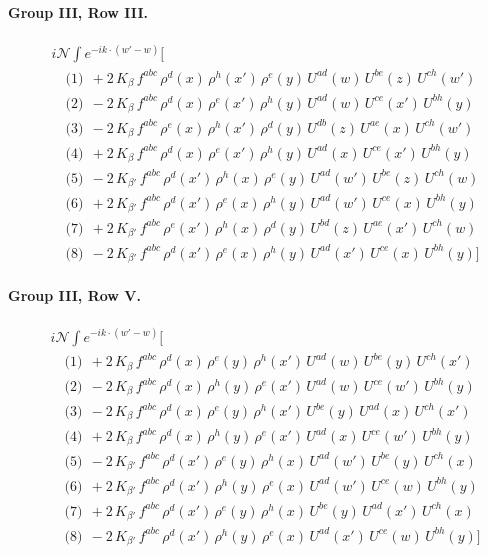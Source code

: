 \documentclass[10pt]{article}
\numberwithin{equation}{section}
\newcommand{\NN}{\mathcal N}
\begin{document}
\paragraph{Group III, Row III.}
\begin{align*}
&i\NN\int e^{-ik\cdot(w'-w)}\Big[\\
&\quad\text{(1)}\ \ +2\,K_{\beta}\,f^{abc}\,\rho^{d}(x)\,\rho^{h}(x')\,\rho^{e}(y)\,U^{ad}(w)\,U^{be}(z)\,U^{ch}(w')\\
&\quad\text{(2)}\ \ -2\,K_{\beta}\,f^{abc}\,\rho^{d}(x)\,\rho^{e}(x')\,\rho^{h}(y)\,U^{ad}(w)\,U^{ce}(x')\,U^{bh}(y)\\
&\quad\text{(3)}\ \ -2\,K_{\beta}\,f^{abc}\,\rho^{e}(x)\,\rho^{h}(x')\,\rho^{d}(y)\,U^{db}(z)\,U^{ae}(x)\,U^{ch}(w')\\
&\quad\text{(4)}\ \ +2\,K_{\beta}\,f^{abc}\,\rho^{d}(x)\,\rho^{e}(x')\,\rho^{h}(y)\,U^{ad}(x)\,U^{ce}(x')\,U^{bh}(y)\\
&\quad\text{(5)}\ \ -2\,K_{\beta'}\,f^{abc}\,\rho^{d}(x')\,\rho^{h}(x)\,\rho^{e}(y)\,U^{ad}(w')\,U^{be}(z)\,U^{ch}(w)\\
&\quad\text{(6)}\ \ +2\,K_{\beta'}\,f^{abc}\,\rho^{d}(x')\,\rho^{e}(x)\,\rho^{h}(y)\,U^{ad}(w')\,U^{ce}(x)\,U^{bh}(y)\\
&\quad\text{(7)}\ \ +2\,K_{\beta'}\,f^{abc}\,\rho^{e}(x')\,\rho^{h}(x)\,\rho^{d}(y)\,U^{bd}(z)\,U^{ae}(x')\,U^{ch}(w)\\
&\quad\text{(8)}\ \ -2\,K_{\beta'}\,f^{abc}\,\rho^{d}(x')\,\rho^{e}(x)\,\rho^{h}(y)\,U^{ad}(x')\,U^{ce}(x)\,U^{bh}(y)\Big]
\end{align*}
\paragraph{Group III, Row V.}
\begin{align*}
&i\NN\int e^{-ik\cdot(w'-w)}\Big[\\
&\quad\text{(1)}\ \ +2\,K_{\beta}\,f^{abc}\,\rho^{d}(x)\,\rho^{e}(y)\,\rho^{h}(x')\,U^{ad}(w)\,U^{be}(y)\,U^{ch}(x')\\
&\quad\text{(2)}\ \ -2\,K_{\beta}\,f^{abc}\,\rho^{d}(x)\,\rho^{h}(y)\,\rho^{e}(x')\,U^{ad}(w)\,U^{ce}(w')\,U^{bh}(y)\\
&\quad\text{(3)}\ \ -2\,K_{\beta}\,f^{abc}\,\rho^{d}(x)\,\rho^{e}(y)\,\rho^{h}(x')\,U^{be}(y)\,U^{ad}(x)\,U^{ch}(x')\\
&\quad\text{(4)}\ \ +2\,K_{\beta}\,f^{abc}\,\rho^{d}(x)\,\rho^{h}(y)\,\rho^{e}(x')\,U^{ad}(x)\,U^{ce}(w')\,U^{bh}(y)\\
&\quad\text{(5)}\ \ -2\,K_{\beta'}\,f^{abc}\,\rho^{d}(x')\,\rho^{e}(y)\,\rho^{h}(x)\,U^{ad}(w')\,U^{be}(y)\,U^{ch}(x)\\
&\quad\text{(6)}\ \ +2\,K_{\beta'}\,f^{abc}\,\rho^{d}(x')\,\rho^{h}(y)\,\rho^{e}(x)\,U^{ad}(w')\,U^{ce}(w)\,U^{bh}(y)\\
&\quad\text{(7)}\ \ +2\,K_{\beta'}\,f^{abc}\,\rho^{d}(x')\,\rho^{e}(y)\,\rho^{h}(x)\,U^{be}(y)\,U^{ad}(x')\,U^{ch}(x)\\
&\quad\text{(8)}\ \ -2\,K_{\beta'}\,f^{abc}\,\rho^{d}(x')\,\rho^{h}(y)\,\rho^{e}(x)\,U^{ad}(x')\,U^{ce}(w)\,U^{bh}(y)\Big]
\end{align*}
\end{document}
